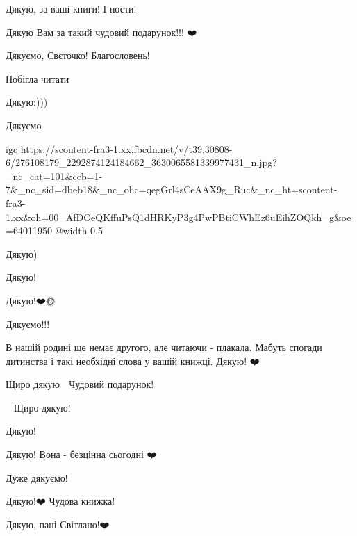 
Дякую, за ваші книги! І пости!


Дякую Вам за такий чудовий подарунок!!! ❤️


Дякуємо, Свєточко! Благословень!


Побігла читати


Дякую:)))


Дякуємо🙏

\ifcmt
  igc https://scontent-fra3-1.xx.fbcdn.net/v/t39.30808-6/276108179_2292874124184662_3630065581339977431_n.jpg?_nc_cat=101&ccb=1-7&_nc_sid=dbeb18&_nc_ohc=qegGrl4sCeAAX9g_Ruc&_nc_ht=scontent-fra3-1.xx&oh=00_AfDOeQKffuPsQ1dHRKyP3g4PwPBtiCWhEz6uEihZOQkh_g&oe=64011950
	@width 0.5
\fi


Дякую)


Дякую!💞


Дякую!❤️🌞

Дякуємо!!!


В нашій родині ще немає другого, але читаючи - плакала. Мабуть спогади
дитинства і такі необхідні слова у вашій книжці. Дякую! ❤️


Щиро дякую 💓 Чудовий подарунок!


💛💙🌿Щиро дякую!


Дякую!💖


Дякую! Вона - безцінна сьогодні ❤️


Дуже дякуємо!


Дякую!❤️
Чудова книжка!


Дякую, пані Світлано!❤️

